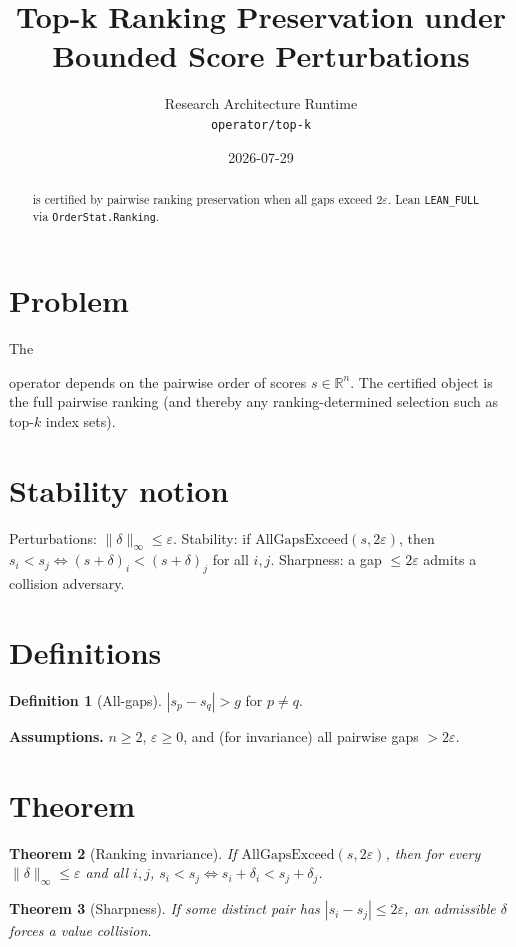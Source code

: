 \documentclass[12pt]{article}
\title{Top-k Ranking Preservation under Bounded Score Perturbations}
\author{Research Architecture Runtime\\[0.25em]
{\normalsize\texttt{operator/top-k}}}
\date{2026-07-29}
\theoremstyle{plain}
\newtheorem{theorem}{Theorem}
\theoremstyle{definition}
\newtheorem{definition}[theorem]{Definition}
\theoremstyle{remark}
\newcommand{\leanpath}[1]{%
  {\raggedright\urlstyle{tt}\path{#1}}}
\begin{document}
\maketitle

\begin{abstract}
\leanpath{top-k} is certified by pairwise ranking preservation when all gaps exceed $2\varepsilon$. Lean \texttt{LEAN\_FULL} via \texttt{OrderStat.Ranking}.
\end{abstract}

\noindent
\begin{center}
\end{center}
\vspace{0.6em}

\section{Problem}
{\raggedright\sloppy
The \leanpath{top-k} operator depends on the pairwise order of scores $s\in\mathbb{R}^n$. The certified object is the full pairwise ranking (and thereby any ranking-determined selection such as top-$k$ index sets).
\par}

\section{Stability notion}
Perturbations: $\|\delta\|_\infty\le\varepsilon$. Stability: if $\mathrm{AllGapsExceed}(s,2\varepsilon)$, then $s_i<s_j\Leftrightarrow (s+\delta)_i<(s+\delta)_j$ for all $i,j$. Sharpness: a gap $\le 2\varepsilon$ admits a collision adversary.

\section{Definitions}
\begin{definition}[All-gaps]
$|s_p-s_q|>g$ for $p\neq q$.\end{definition}
\noindent\textbf{Assumptions.} $n\ge 2$, $\varepsilon\ge 0$, and (for invariance) all pairwise gaps $>2\varepsilon$.

\section{Theorem}
\begin{theorem}[Ranking invariance]\label{thm:inv}
If $\mathrm{AllGapsExceed}(s,2\varepsilon)$, then for every $\|\delta\|_\infty\le\varepsilon$ and all $i,j$, $s_i<s_j\Leftrightarrow s_i+\delta_i<s_j+\delta_j$.
\end{theorem}
\begin{theorem}[Sharpness]\label{thm:sharp}
If some distinct pair has $|s_i-s_j|\le 2\varepsilon$, an admissible $\delta$ forces a value collision.
\end{theorem}
\end{document}
